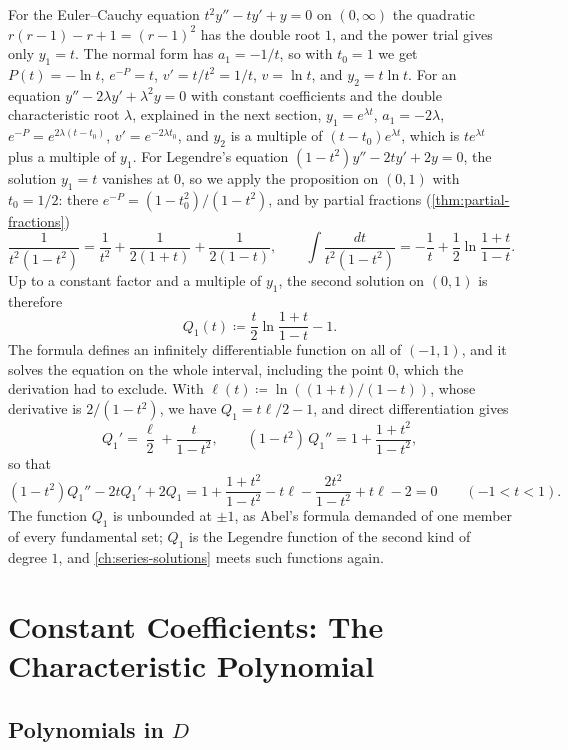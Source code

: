 For the Euler--Cauchy equation $t^2y''-ty'+y=0$ on $(0,\infty)$ the quadratic $r(r-1)-r+1=(r-1)^2$ has the double root $1$, and the power trial gives only $y_1=t$. The normal form has $a_1=-1/t$, so with $t_0=1$ we get $P(t)=-\ln t$, $e^{-P}=t$, $v'=t/t^2=1/t$, $v=\ln t$, and $y_2=t\ln t$. For an equation $y''-2\lambda y'+\lambda^2y=0$ with constant coefficients and the double characteristic root $\lambda$, explained in the next section, $y_1=e^{\lambda t}$, $a_1=-2\lambda$, $e^{-P}=e^{2\lambda(t-t_0)}$, $v'=e^{-2\lambda t_0}$, and $y_2$ is a multiple of $(t-t_0)e^{\lambda t}$, which is $te^{\lambda t}$ plus a multiple of $y_1$. For Legendre's equation $(1-t^2)y''-2ty'+2y=0$, the solution $y_1=t$ vanishes at $0$, so we apply the proposition on $(0,1)$ with $t_0=1/2$: there $e^{-P}=(1-t_0^2)/(1-t^2)$, and by partial fractions (\cref{thm:partial-fractions})
\[
\frac1{t^2(1-t^2)}=\frac1{t^2}+\frac1{2(1+t)}+\frac1{2(1-t)},\qquad\int\frac{dt}{t^2(1-t^2)}=-\frac1t+\frac12\ln\frac{1+t}{1-t}.
\]
Up to a constant factor and a multiple of $y_1$, the second solution on $(0,1)$ is therefore
\[
Q_1(t)\coloneqq\frac t2\ln\frac{1+t}{1-t}-1 .
\]
The formula defines an infinitely differentiable function on all of $(-1,1)$, and it solves the equation on the whole interval, including the point $0$, which the derivation had to exclude. With $\ell(t)\coloneqq\ln((1+t)/(1-t))$, whose derivative is $2/(1-t^2)$, we have $Q_1=t\ell/2-1$, and direct differentiation gives
\[
Q_1'=\frac\ell2+\frac t{1-t^2},\qquad(1-t^2)\,Q_1''=1+\frac{1+t^2}{1-t^2},
\]
so that
\[
(1-t^2)Q_1''-2tQ_1'+2Q_1=1+\frac{1+t^2}{1-t^2}-t\ell-\frac{2t^2}{1-t^2}+t\ell-2=0\qquad(-1<t<1).
\]
The function $Q_1$ is unbounded at $\pm1$, as Abel's formula demanded of one member of every fundamental set; $Q_1$ is the Legendre function of the second kind of degree $1$, and \cref{ch:series-solutions} meets such functions again.

\section{Constant Coefficients: The Characteristic Polynomial}
\label{sec:constant-coefficients}

\subsection{Polynomials in \texorpdfstring{$D$}{D}}

